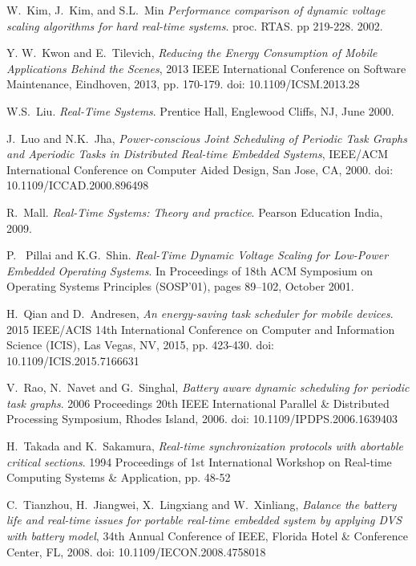 \documentclass[10pt,article]{IEEEtran}
\begin{document}
\begin{thebibliography}{1}
W.~Kim, J.~Kim, and S.L.~Min \emph{Performance comparison of dynamic voltage scaling algorithms for hard real-time systems}. proc. RTAS. pp 219-228. 2002.

Y. W.~Kwon and E.~Tilevich, \emph{Reducing the Energy Consumption of Mobile Applications Behind the Scenes}, 2013 IEEE International Conference on Software Maintenance, Eindhoven, 2013, pp. 170-179. doi: 10.1109/ICSM.2013.28

W.S.~Liu. \emph{Real-Time Systems}. Prentice Hall, Englewood Cliffs, NJ, June 2000.

J.~Luo and N.K.~Jha, \emph{Power-conscious Joint Scheduling of Periodic Task Graphs and Aperiodic Tasks in Distributed Real-time Embedded Systems}, IEEE/ACM International Conference on Computer Aided Design, San Jose, CA, 2000. doi: 10.1109/ICCAD.2000.896498

R.~Mall. \emph{Real-Time Systems: Theory and practice}. Pearson Education India, 2009.

P.~ Pillai and K.G.~Shin. \emph{Real-Time Dynamic Voltage Scaling
for Low-Power Embedded Operating Systems}.  In Proceedings of 18th ACM Symposium on Operating Systems Principles (SOSP’01), pages 89–102, October 2001.

H.~Qian and D.~Andresen, \emph{An energy-saving task scheduler for mobile devices}. 2015 IEEE/ACIS 14th International Conference on Computer and Information Science (ICIS), Las Vegas, NV, 2015, pp. 423-430.
doi: 10.1109/ICIS.2015.7166631

V.~Rao, N.~Navet and G.~Singhal, \emph{Battery aware dynamic scheduling for periodic task graphs}. 2006 Proceedings 20th IEEE International Parallel \& Distributed Processing Symposium, Rhodes Island, 2006. doi: 10.1109/IPDPS.2006.1639403  

H.~Takada and K.~Sakamura, \emph{Real-time synchronization protocols with abortable critical sections}. 1994 Proceedings of 1st International Workshop on Real-time Computing Systems \& Application, pp. 48-52

C.~Tianzhou, H.~Jiangwei, X.~Lingxiang and W.~Xinliang, \emph{Balance the battery life and real-time issues for portable real-time embedded system by applying DVS with battery model}, 34th Annual Conference of IEEE, Florida Hotel \& Conference Center, FL, 2008. doi: 10.1109/IECON.2008.4758018


\end{thebibliography}
\end{document}
